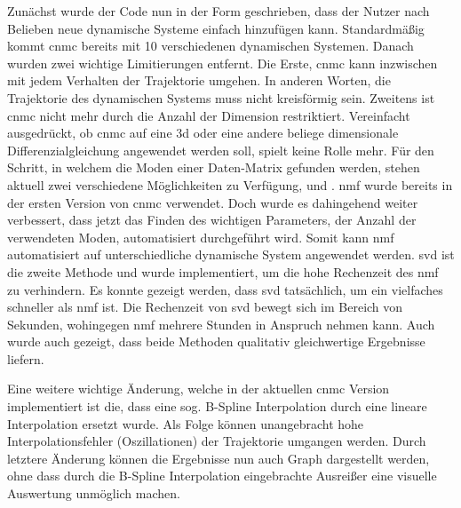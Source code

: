 Zunächst wurde der Code nun in der Form geschrieben, dass der Nutzer nach Belieben neue dynamische Systeme einfach hinzufügen kann. Standardmäßig kommt \gls{cnmc} bereits mit 10 verschiedenen dynamischen Systemen. Danach wurden zwei wichtige Limitierungen entfernt. Die Erste, \gls{cnmc} kann inzwischen mit jedem Verhalten der Trajektorie umgehen. In anderen Worten, die Trajektorie des dynamischen Systems muss nicht kreisförmig sein. Zweitens ist \gls{cnmc} nicht mehr durch die Anzahl der Dimension restriktiert. Vereinfacht ausgedrückt, ob \gls{cnmc} auf eine 3d oder eine andere beliege dimensionale Differenzialgleichung angewendet werden soll, spielt keine Rolle mehr.
Für den Schritt, in welchem die Moden einer Daten-Matrix gefunden werden, stehen aktuell zwei verschiedene Möglichkeiten zu Verfügung,  und . \gls{nmf} wurde bereits in der ersten Version von \gls{cnmc} verwendet. 
Doch wurde es dahingehend weiter verbessert, dass jetzt das Finden des wichtigen Parameters, der Anzahl der verwendeten Moden, automatisiert durchgeführt wird.
Somit kann \gls{nmf} automatisiert auf unterschiedliche dynamische System angewendet werden.
\gls{svd} ist die zweite Methode und wurde implementiert, um die hohe Rechenzeit des \gls{nmf} zu verhindern.
Es konnte gezeigt werden, dass \gls{svd} tatsächlich, um ein vielfaches schneller als  \gls{nmf} ist. 
Die Rechenzeit von \gls{svd} bewegt sich im Bereich von Sekunden, wohingegen \gls{nmf} mehrere Stunden in Anspruch nehmen kann.
Auch wurde auch gezeigt, dass beide Methoden qualitativ gleichwertige Ergebnisse liefern.\newline


Eine weitere wichtige Änderung, welche in der aktuellen \gls{cnmc} Version implementiert ist die, dass eine sog. B-Spline Interpolation durch eine lineare Interpolation ersetzt wurde. Als Folge können unangebracht hohe Interpolationsfehler (Oszillationen) der Trajektorie umgangen werden. Durch letztere Änderung können die Ergebnisse nun auch Graph dargestellt werden, ohne dass durch die B-Spline Interpolation eingebrachte Ausreißer eine visuelle Auswertung unmöglich machen.\newline 


